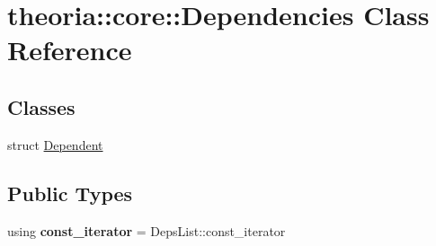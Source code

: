 \hypertarget{classtheoria_1_1core_1_1Dependencies}{\section{theoria\+:\+:core\+:\+:Dependencies Class Reference}
\label{classtheoria_1_1core_1_1Dependencies}
}
\subsection*{Classes}
\begin{DoxyCompactItemize}
\item 
struct \hyperlink{structtheoria_1_1core_1_1Dependencies_1_1Dependent}{Dependent}
\end{DoxyCompactItemize}
\subsection*{Public Types}
\begin{DoxyCompactItemize}
\item 
\hypertarget{classtheoria_1_1core_1_1Dependencies_af58b879e807df8fb52b96c9ab1eb6073}{using {\bfseries const\+\_\+iterator} = Deps\+List\+::const\+\_\+iterator}\label{classtheoria_1_1core_1_1Dependencies_af58b879e807df8fb52b96c9ab1eb6073}

\end{DoxyCompactItemize}
